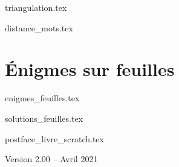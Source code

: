 \documentclass[10pt,twoside]{report}
\begin{document}
{triangulation.tex}

{distance_mots.tex}

\clearemptydoublepage
\setcounter{chapter}{0}

\part{Énigmes sur feuilles}

{enigmes_feuilles.tex}

{solutions_feuilles.tex}



{postface_livre_scratch.tex}

\vfill


\centerline{Version 2.00 -- Avril 2021}
\end{document}
